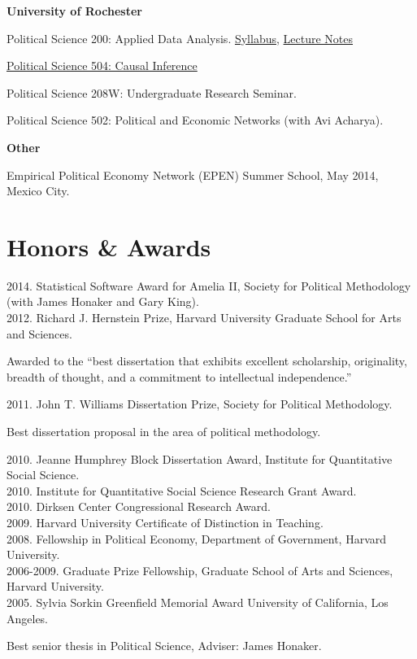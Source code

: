 \documentclass[margin,line]{res}
\newenvironment{list1}{
  \begin{list}{\ding{113}}{%
      \setlength{\itemsep}{0in}
      \setlength{\parsep}{0in} \setlength{\parskip}{0in}
      \setlength{\topsep}{0in} \setlength{\partopsep}{0in} 
      \setlength{\leftmargin}{0.83 cm}}}{\end{list}}
\begin{document}
\begin{resume}
{\bf University of Rochester}
\begin{list1}
\item[] Political Science 200: Applied Data Analysis. \href{http://www.mattblackwell.org/files/teaching/psc200-syllabus.pdf}{Syllabus}, \href{http://www.mattblackwell.org/files/teaching/psc200-notes.pdf}{Lecture Notes}
\item[] \href{http://www.mattblackwell.org/teaching/psc504/}{Political Science 504: Causal Inference}
\item[] Political Science 208W: Undergraduate Research Seminar.
\item[] Political Science 502: Political and Economic Networks (with Avi Acharya).
\end{list1}

{\bf Other}
\begin{list1}
\item[] Empirical Political Economy Network (EPEN) Summer School, May 2014, Mexico City. 
\end{list1}

\section{\sc Honors \& Awards}
2014. Statistical Software Award for Amelia II, Society for Political Methodology (with James Honaker and Gary King).\\
2012. Richard J. Hernstein Prize, Harvard University Graduate School
for Arts and Sciences.
\begin{list1}
\item[] Awarded to the ``best dissertation that exhibits excellent scholarship, originality, breadth of 
thought, and a commitment to intellectual independence.''
\end{list1}
\vspace{-1em}
2011. John T. Williams Dissertation Prize, Society for Political Methodology.
\begin{list1} 
\item[] Best dissertation proposal in the area of political methodology.
\end{list1}
\vspace{-1em}
2010. Jeanne Humphrey Block Dissertation Award, Institute for Quantitative Social Science. \\
2010. Institute for Quantitative Social Science Research Grant Award.\\
2010. Dirksen Center Congressional Research Award.\\
2009. Harvard University Certificate of Distinction in Teaching. \\
2008. Fellowship in Political Economy, Department of Government, Harvard
University.\\
2006-2009. Graduate Prize Fellowship, Graduate School of Arts and Sciences, Harvard
University.\\
2005. Sylvia Sorkin Greenfield Memorial Award University of California, Los Angeles.
\begin{list1} 
\item[] Best senior thesis in Political Science, Adviser: James Honaker.
\end{list1}




\end{resume}
\end{document}
